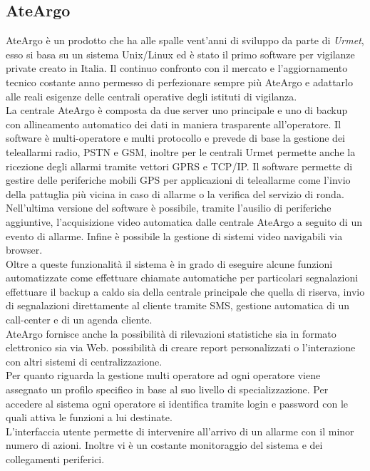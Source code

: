 \subsection{AteArgo}
AteArgo è un prodotto che ha alle spalle vent'anni di sviluppo da parte di \emph{Urmet}, esso si basa su un sistema Unix/Linux ed è stato il primo software per vigilanze private creato in Italia. Il continuo confronto con il mercato e l'aggiornamento tecnico costante anno permesso di perfezionare sempre più AteArgo e adattarlo alle reali esigenze delle centrali operative degli istituti di vigilanza.\\
La centrale AteArgo è composta da due server uno principale e uno di backup con allineamento automatico dei dati in maniera trasparente all'operatore. Il software è multi-operatore e multi protocollo e prevede di base la gestione dei teleallarmi radio, PSTN e GSM, inoltre per le centrali Urmet permette anche la ricezione degli allarmi tramite vettori GPRS e TCP/IP. Il software permette di gestire delle periferiche mobili GPS per applicazioni di teleallarme come l'invio della pattuglia più vicina in caso di allarme o la verifica del servizio di ronda. Nell'ultima versione del software è possibile, tramite l'ausilio di periferiche aggiuntive, l'acquisizione video automatica dalle centrale AteArgo a seguito di un evento di allarme. Infine è possibile la gestione di sistemi video navigabili via browser.\\
Oltre a queste funzionalità il sistema è in grado di eseguire alcune funzioni automatizzate come effettuare chiamate automatiche per particolari segnalazioni effettuare il backup a caldo sia della centrale principale che quella di riserva, invio di segnalazioni direttamente al cliente tramite SMS, gestione automatica di un call-center e di un agenda cliente.\\
AteArgo fornisce anche la possibilità di rilevazioni statistiche sia in formato elettronico sia via Web. possibilità di creare report personalizzati o l'interazione con altri sistemi di centralizzazione.\\
Per quanto riguarda la gestione multi operatore ad ogni operatore viene assegnato un profilo specifico in base al suo livello di specializzazione. Per accedere al sistema ogni operatore si identifica tramite login e password con le quali attiva le funzioni a lui destinate.\\
L'interfaccia utente permette di intervenire all'arrivo di un allarme con il minor numero di azioni. Inoltre vi è un costante monitoraggio del sistema e dei collegamenti periferici.\\
